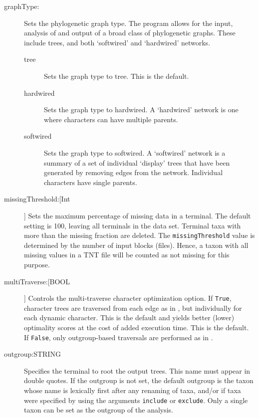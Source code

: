 \begin{description}
		\item[graphType:] Sets the phylogenetic graph type. The program allows for the input, 
		analysis of and output of a broad class of phylogenetic graphs. These include trees, 
		and both `softwired’ and `hardwired’ networks. 
			
			\begin{description}
			\item[tree] Sets the graph type to tree. This is the default.
		
			\item[hardwired]  Sets the graph type to hardwired. A `hardwired' network is 
			one where characters can have multiple parents.
	
			\item[softwired]  Sets the graph type to softwired. A `softwired' network is 
			a summary of a set of individual `display' trees
			that have been generated by removing edges from the network. Individual 
			characters have single parents.				
			\end{description}
		
		\item[missingThreshold:[Int]] Sets the maximum percentage of missing data in a terminal.
		The default setting is 100, leaving all terminals in the data set.  Terminal taxa
		with more than the missing fraction are deleted.  The \texttt{missingThreshold} value is determined 
		by the number of input blocks (files).  Hence, a taxon with all missing values in a TNT file
		will be counted as not missing for this purpose.   
		
		\item[multiTraverse:[BOOL]] Controls the multi-traverse character optimization 
		option. If \texttt{True}, character trees are traversed from each edge as in 
		\citep{VaronandWheeler2012,VaronandWheeler2013, POY4, POY5}, but 
		individually for each dynamic character. This is the default and yields better 
		(lower) optimality scores at the cost of added execution time. This is the default.
		If \texttt{False}, only outgroup-based traversals are performed as in 
		\citep{Wheeler1996, POY2, POY3}. 
					
		\item[outgroup:STRING] Specifies the terminal to root the output trees. 
		This name must appear in double quotes. If the outgroup is not set, the 
		default outgroup is the taxon whose name is lexically first after any renaming 
		of taxa, and/or if taxa were specified by using the arguments \texttt{include} 
		or \texttt{exclude}. Only a single taxon can be set as the outgroup of the analysis. 
					

\end{description}
